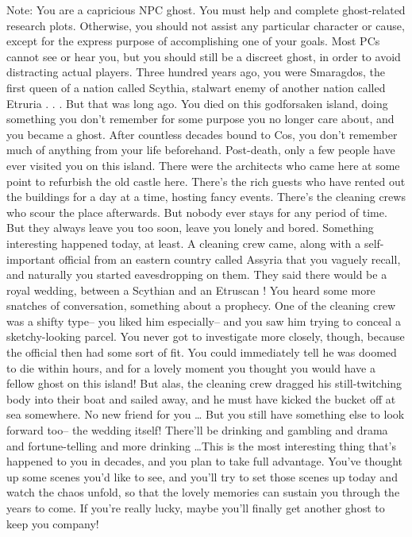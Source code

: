 \documentclass[char]{Kos}
\begin{document}
\name{\cGhost{}}

	Note: You are a capricious NPC ghost. You must help \cAnarchist{} and \cButler{} complete ghost-related research plots. Otherwise, you should not assist any particular character or cause, except for the express purpose of accomplishing one of your goals. Most PCs cannot see or hear you, but you should still be a discreet ghost, in order to avoid distracting actual players.
	Three hundred years ago, you were Smaragdos, the first queen of a nation called Scythia, stalwart enemy of another nation called Etruria . . . But that was long ago. You died on this godforsaken island, doing something you don't remember for some purpose you no longer care about, and you became a ghost. After countless decades bound to Cos, you don't remember much of anything from your life beforehand.
	 Post-death, only a few people have ever visited you on this island. There were the architects who came here at some point to refurbish the old castle here. There's the rich guests who have rented out the buildings for a day at a time, hosting fancy events. There's the cleaning crews who scour the place afterwards. But nobody ever stays for any period of time. But they always leave you too soon, leave you lonely and bored.
	 Something interesting happened today, at least. A cleaning crew came, along with a self-important official from an eastern country called Assyria that you vaguely recall, and naturally you started eavesdropping on them. They said there would be a royal wedding, between a Scythian \cBride{\prince} and an Etruscan \cGroom{\prince}! You heard some more snatches of conversation, something about a prophecy. One of the cleaning crew was a shifty type-- you liked him especially-- and you saw him trying to conceal a sketchy-looking parcel. You never got to investigate more closely, though, because the official then had some sort of fit. You could immediately tell he was doomed to die within hours, and for a lovely moment you thought you would have a fellow ghost on this island! But alas, the cleaning crew dragged his still-twitching body into their boat and sailed away, and he must have kicked the bucket off at sea somewhere. No new friend for you \ldots
	 But you still have something else to look forward too-- the wedding itself! There'll be drinking and gambling and drama and fortune-telling and more drinking \ldots This is the most interesting thing that's happened to you in decades, and you plan to take full advantage. You've thought up some scenes you'd like to see, and you'll try to set those scenes up today and watch the chaos unfold, so that the lovely memories can sustain you through the years to come.
	 If you're really lucky, maybe you'll finally get another ghost to keep you company!
\end{document}
